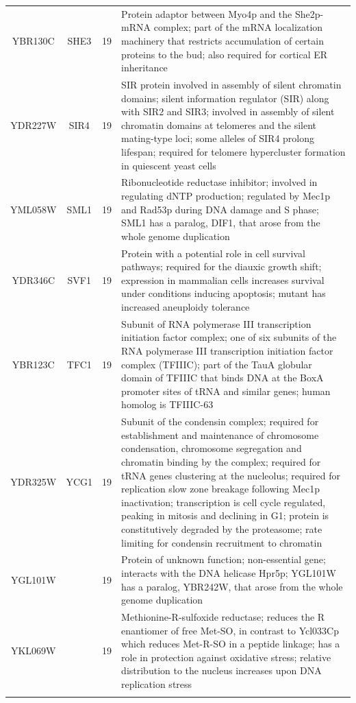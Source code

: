 \documentclass[]{article}
\begin{document}
\begin{longtable}{@{\extracolsep{3pt}} cccp{85mm}}
YBR130C & SHE3 & 19 & Protein adaptor between Myo4p and the She2p-mRNA complex; part of the mRNA localization machinery that restricts accumulation of certain proteins to the bud; also required for cortical ER inheritance \\ 
YDR227W & SIR4 & 19 & SIR protein involved in assembly of silent chromatin domains; silent information regulator (SIR) along with SIR2 and SIR3; involved in assembly of silent chromatin domains at telomeres and the silent mating-type loci; some alleles of SIR4 prolong lifespan; required for telomere hypercluster formation in quiescent yeast cells \\ 
YML058W & SML1 & 19 & Ribonucleotide reductase inhibitor; involved in regulating dNTP production; regulated by Mec1p and Rad53p during DNA damage and S phase; SML1 has a paralog, DIF1, that arose from the whole genome duplication \\ 
YDR346C & SVF1 & 19 & Protein with a potential role in cell survival pathways; required for the diauxic growth shift; expression in mammalian cells increases survival under conditions inducing apoptosis; mutant has increased aneuploidy tolerance \\ 
YBR123C & TFC1 & 19 & Subunit of RNA polymerase III transcription initiation factor complex; one of six subunits of the RNA polymerase III transcription initiation factor complex (TFIIIC); part of the TauA globular domain of TFIIIC that binds DNA at the BoxA promoter sites of tRNA and similar genes; human homolog is TFIIIC-63 \\ 
YDR325W & YCG1 & 19 & Subunit of the condensin complex; required for establishment and maintenance of chromosome condensation, chromosome segregation and chromatin binding by the complex; required for tRNA genes clustering at the nucleolus; required for replication slow zone breakage following Mec1p inactivation; transcription is cell cycle regulated, peaking in mitosis and declining in G1; protein is constitutively degraded by the proteasome; rate limiting for condensin recruitment to chromatin \\ 
YGL101W &  & 19 & Protein of unknown function; non-essential gene; interacts with the DNA helicase Hpr5p; YGL101W has a paralog, YBR242W, that arose from the whole genome duplication \\ 
YKL069W &  & 19 & Methionine-R-sulfoxide reductase; reduces the R enantiomer of free Met-SO, in contrast to Ycl033Cp which reduces Met-R-SO in a peptide linkage; has a role in protection against oxidative stress; relative distribution to the nucleus increases upon DNA replication stress \\   \hline \\ [-1.8ex] 

\end{longtable}
\end{document}
